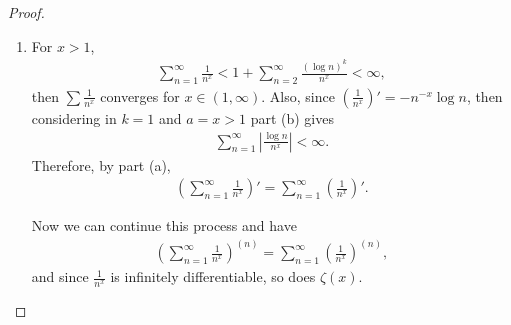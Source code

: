 \documentclass[11pt]{article}
\theoremstyle{definition}
\numberwithin{equation}{subsection}
\begin{document}
\begin{proof}
\begin{enumerate}[label=(\alph*)]
    \item For $x > 1$, 
    \begin{align*}
        \sum^\infty_{n=1} \frac{1}{n^x} < 1 + \sum^\infty_{n=2} \frac{(\log n)^k}{n^x} < \infty,
    \end{align*}
    then $  \sum \frac{1}{n^x}$ converges for $x \in (1, \infty)$. Also, since $  \left(\frac{1}{n^x}\right)' = - n^{-x} \log n$, then considering in $k = 1$ and $a = x > 1$ part (b) gives
    \begin{align*}
        \sum^\infty_{n=1} \left|\frac{\log n}{n^x} \right| < \infty.
    \end{align*}
    Therefore, by part (a),
    \begin{align*}
        \left(\sum^\infty_{n=1} \frac{1}{n^x}\right)' = \sum^\infty_{n=1} \left(\frac{1}{n^x}\right)'.
    \end{align*}
    
    Now we can continue this process and have
    \begin{align*}
        \left(\sum^\infty_{n=1} \frac{1}{n^x}\right)^{(n)} = \sum^\infty_{n=1} \left(\frac{1}{n^x}\right)^{(n)},
    \end{align*}
    and since $  \frac{1}{n^x}$ is infinitely differentiable, so does $\zeta(x)$.
\end{enumerate}
\end{proof}

\medskip
\end{document}
